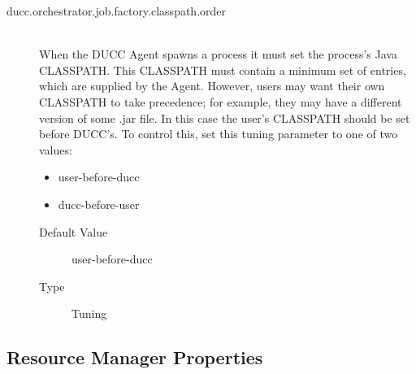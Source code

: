 \begin{description}
      \item[ducc.orchestrator.job.factory.classpath.order] \hfill \\
        When the DUCC Agent spawns a process it must set the process's Java CLASSPATH. 
        This CLASSPATH must contain a minimum set of entries, which are supplied by the 
        Agent. However, users may want their own CLASSPATH to take precedence; for 
        example, they may have a different version of some .jar file. In this case the user's 
        CLASSPATH should be set before DUCC's. To control this, set this tuning parameter to 
        one of two values: 
        \begin{itemize}
          \item[] user-before-ducc 
          \item[]ducc-before-user
        \end{itemize}
 
        \begin{description}
          \item[Default Value] user-before-ducc 
          \item[Type] Tuning 
        \end{description}

      
      \end{description}

    
\subsection{Resource Manager Properties}

